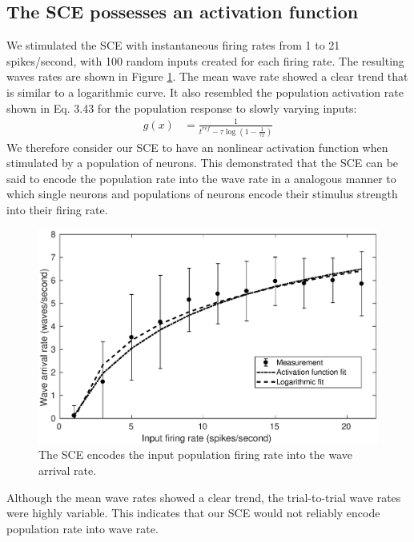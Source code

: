 \documentclass[12pt]{article}
\begin{document}
\FloatBarrier

\subsection*{The SCE possesses an activation function}
We stimulated the SCE with instantaneous firing rates from 1 to 21 spikes/second, with 100 random inputs created for each firing rate.
The resulting waves rates are shown in Figure \ref{fig:sce_activation_function}.
The mean wave rate showed a clear trend that is similar to a logarithmic curve. 
It also resembled the population activation rate shown in \cite{Trappenberg2010} Eq. 3.43 for the population response to slowly varying inputs:
\begin{align}
 g(x) &= \frac{1}{t^{ref}-\tau \log{(1-\frac{1}{\tau x})}}
\end{align}
We therefore consider our SCE to have an nonlinear activation function when stimulated by a  population of neurons.
This demonstrated that the SCE can be said to encode the population rate into the wave rate in a analogous manner to which single neurons and populations of neurons encode their stimulus strength into their firing rate.

\begin{figure}[!htb]
 \centering
 \includegraphics[width=\textwidth]{fig/SCE_2x2_FRE}
 \caption{The SCE encodes the input population firing rate into the wave arrival rate. }
 \label{fig:sce_activation_function}
\end{figure}

Although the mean wave rates showed a clear trend, the trial-to-trial wave rates were highly variable. 
This indicates that our SCE would not reliably encode population rate into wave rate.
\end{document}
